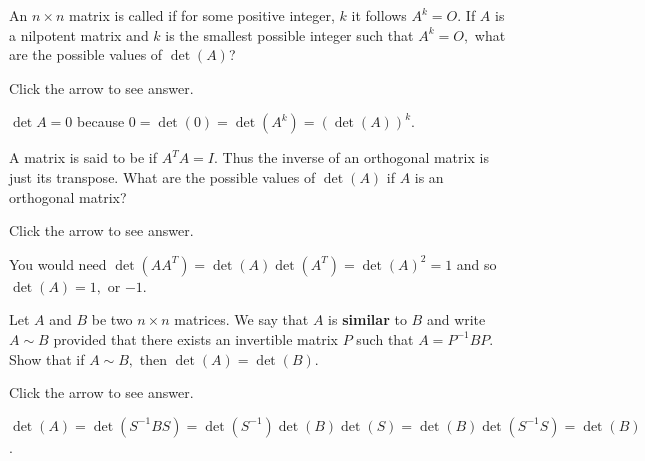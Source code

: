 \documentclass{ximera}
\begin{document}
\begin{problem}\label{prb:7.18} An $n\times n$ matrix is called 
if for some positive integer, $k$ it follows $A^{k}=O.$ If
$A$ is a nilpotent matrix and $k$ is the smallest possible integer such that
$A^{k}=O,$ what are the possible values of $\det \left( A\right)$?

Click the arrow to see answer.
\begin{expandable}
$\det{A}=0$ because $0=\det \left( 0\right) =\det \left( A^{k}\right) =\left( \det
\left( A\right) \right) ^{k}.$
\end{expandable}
\end{problem}

\begin{problem}\label{prb:7.19}A matrix is said to be  if
$A^{T}A=I.$ Thus the inverse of an orthogonal matrix is just its transpose.
What are the possible values of $\det \left( A\right) $ if $A$ is an
orthogonal matrix?

Click the arrow to see answer.
\begin{expandable}
You would need $\det \left( AA^{T}\right) =\det
\left( A\right) \det \left( A^{T}\right) =\det \left( A\right) ^{2}=1$ and
so $\det \left( A\right) =1,$ or $-1$.
\end{expandable}
\end{problem}

\begin{problem}\label{prb:7.20} Let $A$ and $B$ be two $n\times n$ matrices. We say that $A$ is \textbf{similar} to $B$ and write $A\sim B$
provided that there exists an invertible matrix $P$
such that $A=P^{-1}BP.$ Show that if $A\sim B,$ then
$\det \left( A\right) =\det \left( B\right)$.

Click the arrow to see answer.
\begin{expandable}
$\det \left( A\right) =\det
\left( S^{-1}BS\right) =\det \left( S^{-1}\right) \det \left( B\right) \det
\left( S\right) =\det \left( B\right) \det \left( S^{-1}S\right) =\det
\left( B\right) $.
\end{expandable}
\end{problem}
\end{document}
